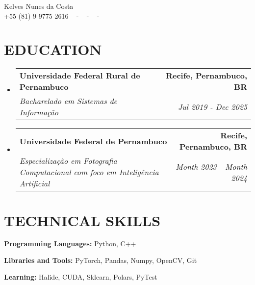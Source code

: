 \documentclass[letterpaper,11pt]{article}
\makeatletter
\newcommand{\resumeSubheading}[4]{
  \vspace{-2pt}\item
    \begin{tabular*}{1.0\textwidth}[t]{l@{\extracolsep{\fill}}r}
      \textbf{\large#1} & \textbf{\small #2} \\
      \textit{\large#3} & \textit{\small #4} \\
      
    \end{tabular*}\vspace{-7pt}
}
\newcommand{\resumeSubHeadingListStart}{\begin{itemize}[leftmargin=0.0in, label={}]}
\newcommand{\resumeSubHeadingListEnd}{\end{itemize}}
\makeatother
\begin{document}


\begin{center}
    {\huge Kelves Nunes da Costa} \\ \vspace{2pt} 
    {+55 (81) 9 9775 2616} ~ 
    \small{-}
    \href{mailto:[kelves.nunes@gmail.com]}{\color{blue}{kelves.nunes@gmail.com}} ~ 
    \small{-}
    \href{[linkedin.com/in/kelvescosta/]}{ \color{blue}{LinkedIn Profile}}  ~
    \small{-}
	\href{[https://github.com/kelvesc]}{\color{blue}{GitHub Profile}} ~ 
    \vspace{-7pt}
\end{center}

\section{\color{airforceblue}EDUCATION}
  \resumeSubHeadingListStart
    \resumeSubheading
      {Universidade Federal Rural de Pernambuco}{Recife, Pernambuco, BR}
      {Bacharelado em Sistemas de Informação}{Jul 2019 - Dec 2025}
    \vspace{-4pt}
     \resumeSubheading
      {Universidade Federal de Pernambuco}{Recife, Pernambuco, BR}
      {Especialização em Fotografia Computacional com foco em Inteligência Artificial}{Month 2023 - Month 2024}
  \resumeSubHeadingListEnd
  \vspace{-10pt}

\section{\color{airforceblue}TECHNICAL SKILLS}
 \begin{itemize}[leftmargin=0in, label={}]
    \small{\item{
     \textbf{\normalsize{Programming Languages:}}{ \normalsize{Python, C++}} \\
      \vspace{1.2pt}
     
     \textbf{\normalsize{Libraries and Tools:}}{ \normalsize{PyTorch, Pandas, Numpy, OpenCV, Git}} \\
      \vspace{1.2pt}
      
     \textbf{\normalsize{Learning:}}{ \normalsize{Halide, CUDA, Sklearn, Polars, PyTest}} \\
      \vspace{1.2pt}
      

     }}
 \end{itemize}
 \vspace{-16pt}
 
\end{document}
